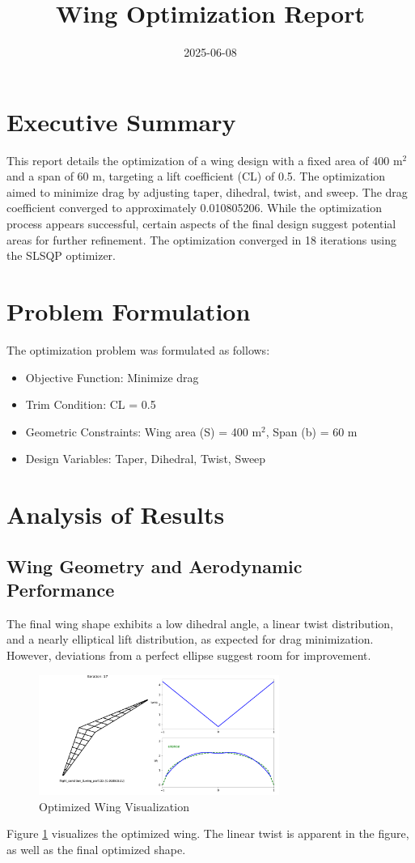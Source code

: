 \documentclass{article}
\title{Wing Optimization Report}
\date{2025-06-08}
\begin{document}
\maketitle

\section{Executive Summary}
This report details the optimization of a wing design with a fixed area of 400 m$^2$ and a span of 60 m, targeting a lift coefficient (CL) of 0.5. The optimization aimed to minimize drag by adjusting taper, dihedral, twist, and sweep. The drag coefficient converged to approximately 0.010805206. While the optimization process appears successful, certain aspects of the final design suggest potential areas for further refinement. The optimization converged in 18 iterations using the SLSQP optimizer.

\section{Problem Formulation}
The optimization problem was formulated as follows:
\begin{itemize}
    \item Objective Function: Minimize drag
    \item Trim Condition: CL = 0.5
    \item Geometric Constraints: Wing area (S) = 400 m$^2$, Span (b) = 60 m
    \item Design Variables: Taper, Dihedral, Twist, Sweep
\end{itemize}

\section{Analysis of Results}

\subsection{Wing Geometry and Aerodynamic Performance}
The final wing shape exhibits a low dihedral angle, a linear twist distribution, and a nearly elliptical lift distribution, as expected for drag minimization. However, deviations from a perfect ellipse suggest room for improvement.

\begin{figure}[h!]
    \centering
    \includegraphics[width=0.7\textwidth]{./Optimized_Wing.pdf}
    \caption{Optimized Wing Visualization}
    \label{fig:optimized_wing}
\end{figure}
Figure \ref{fig:optimized_wing} visualizes the optimized wing.  The linear twist is apparent in the figure, as well as the final optimized shape.
\end{document}

